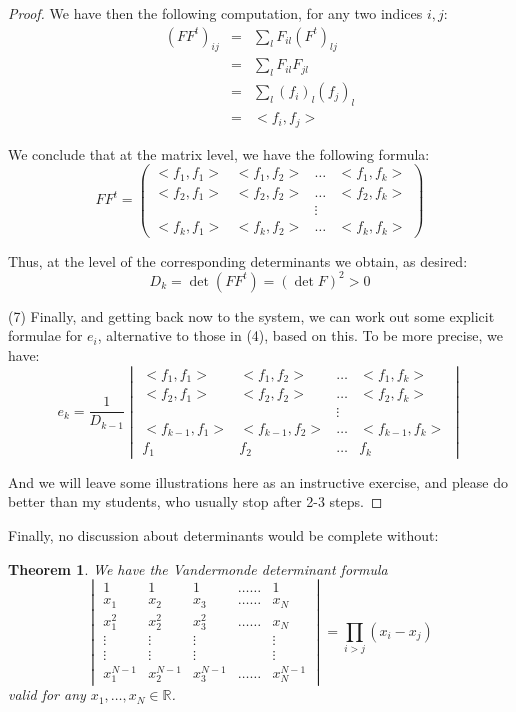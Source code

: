 \documentclass[12pt]{amsbook}
\newtheorem{theorem}{Theorem}[chapter]
\begin{document}
\begin{proof}
We have then the following computation, for any two indices $i,j$:
\begin{eqnarray*}
(FF^t)_{ij}
&=&\sum_lF_{il}(F^t)_{lj}\\
&=&\sum_lF_{il}F_{jl}\\
&=&\sum_l(f_i)_l(f_j)_l\\
&=&<f_i,f_j>
\end{eqnarray*}

We conclude that at the matrix level, we have the following formula:
$$FF^t=\begin{pmatrix}
<f_1,f_1>&<f_1,f_2>&\ldots&<f_1,f_k>\\
<f_2,f_1>&<f_2,f_2>&\ldots&<f_2,f_k>\\
&&\vdots\\
<f_k,f_1>&<f_k,f_2>&\ldots&<f_k,f_k>
\end{pmatrix}$$

Thus, at the level of the corresponding determinants we obtain, as desired:
$$D_k=\det(FF^t)=(\det F)^2>0$$

(7) Finally, and getting back now to the system, we can work out some explicit formulae for $e_i$, alternative to those in (4), based on this. To be more precise, we have:
$$e_k=\frac{1}{D_{k-1}}\begin{vmatrix}
<f_1,f_1>&<f_1,f_2>&\ldots&<f_1,f_k>\\
<f_2,f_1>&<f_2,f_2>&\ldots&<f_2,f_k>\\
&&\vdots\\
<f_{k-1},f_1>&<f_{k-1},f_2>&\ldots&<f_{k-1},f_k>\\
f_1&f_2&\ldots&f_k
\end{vmatrix}$$

And we will leave some illustrations here as an instructive exercise, and please do better than my students, who usually stop after 2-3 steps.
\end{proof}

Finally, no discussion about determinants would be complete without:


\begin{theorem}
We have the Vandermonde determinant formula
$$\begin{vmatrix}
1&1&1&\ldots\ldots&1\\
x_1&x_2&x_3&\ldots\ldots&x_N\\
x_1^2&x_2^2&x_3^2&\ldots\ldots&x_N\\
\vdots&\vdots&\vdots&&\vdots\\
\vdots&\vdots&\vdots&&\vdots\\
x_1^{N-1}&x_2^{N-1}&x_3^{N-1}&\ldots\ldots&x_N^{N-1}
\end{vmatrix}
=\prod_{i>j}(x_i-x_j)$$
valid for any $x_1,\ldots,x_N\in\mathbb R$.
\end{theorem}
\end{document}
